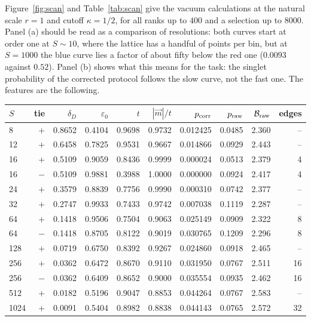 \documentclass[11pt,a4paper]{article}
\begin{document}
Figure~\ref{fig:scan} and Table~\ref{tab:scan} give the vacuum calculations at the natural scale $r=1$ and cutoff $\kappa=1/2$, for all ranks up to $400$ and a selection up to $8000$. Panel (a) should be read as a comparison of resolutions: both curves start at order one at $S\sim10$, where the lattice has a handful of points per bin, but at $S=1000$ the blue curve lies a factor of about fifty below the red one ($0.0093$ against $0.52$). Panel (b) shows what this means for the task: the singlet probability of the corrected protocol follows the slow curve, not the fast one. The features are the following.

\begin{table}[t]
\centering
\footnotesize
\setlength{\tabcolsep}{4pt}
\begin{tabular}{lrrrrrrrrr}
\toprule
$S$ & tie & $\delta_D$ & $\varepsilon_0$ & $t$ & $|\vec m|/t$ & $p_{\rm corr}$ & $p_{\rm raw}$ & $\mathcal B_{\rm raw}$ & edges\\
\midrule
8 & $+$ & 0.8652 & 0.4104 & 0.9698 & 0.9732 & 0.012425 & 0.0485 & 2.360 & --\\
12 & $+$ & 0.6458 & 0.7825 & 0.9531 & 0.9667 & 0.014866 & 0.0929 & 2.443 & --\\
16 & $+$ & 0.5109 & 0.9059 & 0.8436 & 0.9999 & 0.000024 & 0.0513 & 2.379 & 4\\
16 & $-$ & 0.5109 & 0.9881 & 0.3988 & 1.0000 & 0.000000 & 0.0924 & 2.417 & 4\\
24 & $+$ & 0.3579 & 0.8839 & 0.7756 & 0.9990 & 0.000310 & 0.0742 & 2.377 & --\\
32 & $+$ & 0.2747 & 0.9933 & 0.7433 & 0.9742 & 0.007038 & 0.1119 & 2.287 & --\\
64 & $+$ & 0.1418 & 0.9506 & 0.7504 & 0.9063 & 0.025149 & 0.0909 & 2.322 & 8\\
64 & $-$ & 0.1418 & 0.8705 & 0.8122 & 0.9019 & 0.030765 & 0.1209 & 2.296 & 8\\
128 & $+$ & 0.0719 & 0.6750 & 0.8392 & 0.9267 & 0.024860 & 0.0918 & 2.465 & --\\
256 & $+$ & 0.0362 & 0.6472 & 0.8670 & 0.9110 & 0.031950 & 0.0767 & 2.511 & 16\\
256 & $-$ & 0.0362 & 0.6409 & 0.8652 & 0.9000 & 0.035554 & 0.0935 & 2.462 & 16\\
512 & $+$ & 0.0182 & 0.5196 & 0.9047 & 0.8853 & 0.044264 & 0.0767 & 2.583 & --\\
1024 & $+$ & 0.0091 & 0.5404 & 0.8982 & 0.8838 & 0.044143 & 0.0765 & 2.572 & 32\\

\end{tabular}
\end{table}
\end{document}
